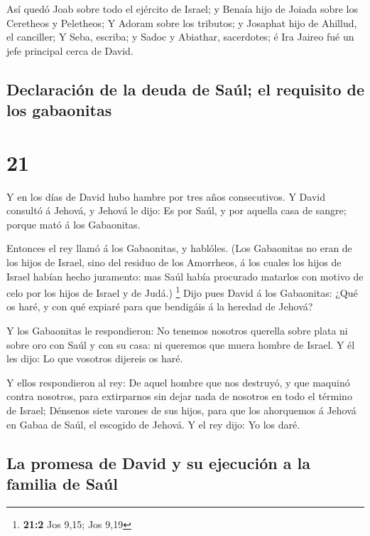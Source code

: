  Así quedó Joab sobre todo el ejército de Israel; y Benaía
hijo de Joiada sobre los Ceretheos y Peletheos;  Y Adoram
sobre los tributos; y Josaphat hijo de Ahillud, el canciller;
 Y Seba, escriba; y Sadoc y Abiathar, sacerdotes; é Ira
Jaireo fué un jefe principal cerca de David. 

\hypertarget{declaraciuxf3n-de-la-deuda-de-sauxfal-el-requisito-de-los-gabaonitas}{%
\subsection{Declaración de la deuda de Saúl; el requisito de los
gabaonitas}\label{declaraciuxf3n-de-la-deuda-de-sauxfal-el-requisito-de-los-gabaonitas}}

\hypertarget{section-20}{%
\section{21}\label{section-20}}

 Y en los días de David hubo hambre por tres años
consecutivos. Y David consultó á Jehová, y Jehová le dijo: Es por Saúl,
y por aquella casa de sangre; porque mató á los Gabaonitas.

 Entonces el rey llamó á los Gabaonitas, y hablóles. (Los
Gabaonitas no eran de los hijos de Israel, sino del residuo de los
Amorrheos, á los cuales los hijos de Israel habían hecho juramento: mas
Saúl había procurado matarlos con motivo de celo por los hijos de Israel
y de Judá.) \footnote{\textbf{21:2} Jos 9,15; Jos 9,19} 
Dijo pues David á los Gabaonitas: ¿Qué os haré, y con qué expiaré para
que bendigáis á la heredad de Jehová?

 Y los Gabaonitas le respondieron: No tenemos nosotros
querella sobre plata ni sobre oro con Saúl y con su casa: ni queremos
que muera hombre de Israel. Y él les dijo: Lo que vosotros dijereis os
haré.

 Y ellos respondieron al rey: De aquel hombre que nos
destruyó, y que maquinó contra nosotros, para extirparnos sin dejar nada
de nosotros en todo el término de Israel;  Dénsenos siete
varones de sus hijos, para que los ahorquemos á Jehová en Gabaa de Saúl,
el escogido de Jehová. Y el rey dijo: Yo los daré.

\hypertarget{la-promesa-de-david-y-su-ejecuciuxf3n-a-la-familia-de-sauxfal}{%
\subsection{La promesa de David y su ejecución a la familia de
Saúl}\label{la-promesa-de-david-y-su-ejecuciuxf3n-a-la-familia-de-sauxfal}}

